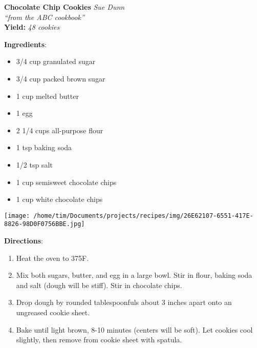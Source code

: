 \documentclass[11pt, twoside, openany]{book}
\begin{document}
\noindent\begin{minipage}[t]{\linewidth}%
{\Large\textbf{Chocolate Chip Cookies}} \label{chocolate-chip-cookies}\hfill\textit{Sue Dunn}\\
\textit{``from the ABC cookbook''}\\
\textbf{Yield:} \textit{48 cookies}\\
\noindent\begin{minipage}[t]{0.78\linewidth}%
\textbf{Ingredients}:\vspace{-3mm}
\begin{multicols}{2}
\begin{itemize}\setlength\itemsep{-1mm}
\item 3/4 cup granulated sugar
\item 3/4 cup packed brown sugar
\item 1 cup melted butter
\item 1 egg
\item 2 1/4 cups all-purpose flour
\item 1 tsp baking soda
\item 1/2 tsp salt
\item 1 cup semisweet chocolate chips
\item 1 cup white chocolate chips
\end{itemize}
\end{multicols}
\end{minipage}
\noindent\begin{minipage}[t]{0.18\linewidth}
\centering \strut\vspace*{-\baselineskip}\newline
\texttt{[image: /home/tim/Documents/projects/recipes/img/26E62107-6551-417E-8826-98D0F0756BBE.jpg]}\\
\end{minipage}\vspace{3mm}
\textbf{Directions}:
\vspace{-3mm}\begin{enumerate}\setlength\itemsep{-1mm}
\item Heat the oven to 375F. 
\item Mix both sugars, butter, and egg in a large bowl. Stir in flour, baking soda and salt (dough will be stiff). Stir in chocolate chips.
\item Drop dough by rounded tablespoonfuls about 3 inches apart onto an ungreased cookie sheet. 
\item Bake until light brown, 8-10 minutes (centers will be soft). Let cookies cool slightly, then remove from cookie sheet with spatula.
\end{enumerate}
\end{minipage}\vspace{8mm}
\end{document}
